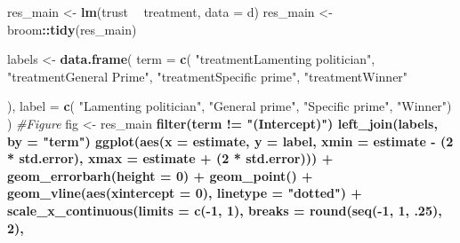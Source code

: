 \documentclass[]{book}
\newenvironment{Shaded}{\begin{snugshade}}{\end{snugshade}}
\newcommand{\KeywordTok}[1]{\textcolor[rgb]{0.13,0.29,0.53}{\textbf{#1}}}
\newcommand{\DataTypeTok}[1]{\textcolor[rgb]{0.13,0.29,0.53}{#1}}
\newcommand{\DecValTok}[1]{\textcolor[rgb]{0.00,0.00,0.81}{#1}}
\newcommand{\StringTok}[1]{\textcolor[rgb]{0.31,0.60,0.02}{#1}}
\newcommand{\CommentTok}[1]{\textcolor[rgb]{0.56,0.35,0.01}{\textit{#1}}}
\newcommand{\OperatorTok}[1]{\textcolor[rgb]{0.81,0.36,0.00}{\textbf{#1}}}
\newcommand{\NormalTok}[1]{#1}
\begin{document}
\begin{Shaded}
\begin{Highlighting}[]
\NormalTok{res_main <-}\StringTok{  }\KeywordTok{lm}\NormalTok{(trust }\OperatorTok{~}\StringTok{ }\NormalTok{treatment, }\DataTypeTok{data =}\NormalTok{ d) }
\NormalTok{res_main <-}\StringTok{ }\NormalTok{broom}\OperatorTok{::}\KeywordTok{tidy}\NormalTok{(res_main)}

\NormalTok{labels <-}\StringTok{ }\KeywordTok{data.frame}\NormalTok{(}
  \DataTypeTok{term =} \KeywordTok{c}\NormalTok{(}
    \StringTok{"treatmentLamenting politician"}\NormalTok{,}
    \StringTok{"treatmentGeneral Prime"}\NormalTok{,}
    \StringTok{"treatmentSpecific prime"}\NormalTok{,}
    \StringTok{"treatmentWinner"}
    
\NormalTok{  ),}
  \DataTypeTok{label =} \KeywordTok{c}\NormalTok{( }\StringTok{"Lamenting politician"}\NormalTok{,}
             \StringTok{"General prime"}\NormalTok{,}
             \StringTok{"Specific prime"}\NormalTok{,}
             \StringTok{"Winner"}\NormalTok{)}
\NormalTok{)}
\CommentTok{#Figure}
\NormalTok{fig <-}\StringTok{   }\NormalTok{res_main }\OperatorTok{%>%}
\StringTok{  }\KeywordTok{filter}\NormalTok{(term }\OperatorTok{!=}\StringTok{ "(Intercept)"}\NormalTok{) }\OperatorTok{%>%}\StringTok{ }
\StringTok{  }\KeywordTok{left_join}\NormalTok{(labels, }\DataTypeTok{by =} \StringTok{"term"}\NormalTok{) }\OperatorTok{%>%}\StringTok{ }
\StringTok{  }
\StringTok{  }\KeywordTok{ggplot}\NormalTok{(}\KeywordTok{aes}\NormalTok{(}\DataTypeTok{x =}\NormalTok{ estimate, }\DataTypeTok{y =}\NormalTok{ label,}
             \DataTypeTok{xmin =}\NormalTok{ estimate }\OperatorTok{-}\StringTok{ }\NormalTok{(}\DecValTok{2} \OperatorTok{*}\StringTok{ }\NormalTok{std.error),}
             \DataTypeTok{xmax =}\NormalTok{ estimate }\OperatorTok{+}\StringTok{ }\NormalTok{(}\DecValTok{2} \OperatorTok{*}\StringTok{ }\NormalTok{std.error))) }\OperatorTok{+}
\StringTok{   }\KeywordTok{geom_errorbarh}\NormalTok{(}\DataTypeTok{height =} \DecValTok{0}\NormalTok{) }\OperatorTok{+}
\StringTok{  }\KeywordTok{geom_point}\NormalTok{() }\OperatorTok{+}
\StringTok{  }\KeywordTok{geom_vline}\NormalTok{(}\KeywordTok{aes}\NormalTok{(}\DataTypeTok{xintercept =} \DecValTok{0}\NormalTok{), }\DataTypeTok{linetype =} \StringTok{"dotted"}\NormalTok{) }\OperatorTok{+}
\StringTok{  }\KeywordTok{scale_x_continuous}\NormalTok{(}\DataTypeTok{limits =} \KeywordTok{c}\NormalTok{(}\OperatorTok{-}\DecValTok{1}\NormalTok{, }\DecValTok{1}\NormalTok{),}
                     \DataTypeTok{breaks =} \KeywordTok{round}\NormalTok{(}\KeywordTok{seq}\NormalTok{(}\OperatorTok{-}\DecValTok{1}\NormalTok{, }\DecValTok{1}\NormalTok{, .}\DecValTok{25}\NormalTok{), }\DecValTok{2}\NormalTok{),}
}}}
\end{Highlighting}
\end{Shaded}
\end{document}
